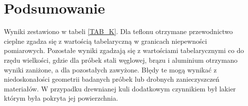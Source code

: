 \documentclass[11pt]{article}
\begin{document}
\section*{Podsumowanie}
Wyniki zestawiono w tabeli \ref{TAB_K}. Dla teflonu otrzymane przewodnictwo
cieplne zgadza się z wartością tabelaryczną w granicach niepewności pomiarowych. 
Pozostałe wyniki zgadzają się z wartościami tabelarycznymi co do rzędu wielkości,
gdzie dla próbek stali węglowej, brązu i aluminium otrzymano wyniki zaniżone, a 
dla pozostałych zawyżone. Błędy te mogą wynikać z niedoskonałości geometrii badanych 
próbek lub drobnych zanieczyszczeń materiałów. W przypadku drewnianej kuli dodatkowym 
czynnikiem był lakier którym była pokryta jej powierzchnia.
\end{document}
